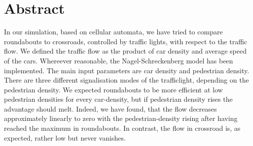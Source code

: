 \section{Abstract}
In our simulation, based on cellular automata, we have tried to compare roundabouts to crossroads, controlled by traffic lights, with respect to the traffic flow. We defined the traffic flow as the product of car density and average speed of the cars. Whereever reasonable, the Nagel-Schreckenberg model has been implemented. The main input parameters are car density and pedestrian density. There are three different signalisation modes of the trafficlight, depending on the pedestrian density. We expected roundabouts to be more efficient at low pedestrian densities for every car-density, but if pedestrian density rises the advantage should melt. Indeed, we have found, that the flow decreases approximately linearly to zero with the pedestrian-density rising after having reached the maximum in roundabouts. In contrast, the flow in crossroad is, as expected, rather low but never vanishes. 
